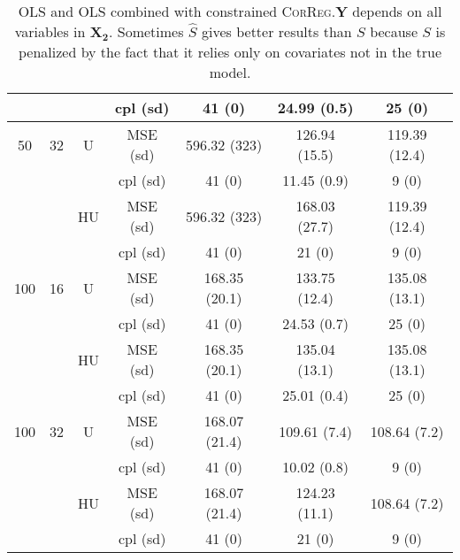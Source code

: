 \documentclass[11pt,a4paper]{article}
\begin{document}
\begin{table}[h!]
\begin{tabular}{|c|c|c|c|c|c|c|}
& & & cpl (sd) & 41 (0) & 24.99 (0.5) & 25 (0) \\
\hline %
50 & 32 & U&MSE (sd) & 596.32 (323) & 126.94 (15.5) & 119.39 (12.4) \\
& & & cpl (sd) & 41 (0) & 11.45 (0.9) & 9 (0) \\
 &  &HU &MSE (sd) & 596.32 (323) & 168.03 (27.7) & 119.39 (12.4) \\
& & &cpl (sd) & 41 (0) & 21 (0) & 9 (0) \\
\hline
\hline %
100 & 16 & U&  MSE (sd) & 168.35 (20.1) & 133.75 (12.4) & 135.08 (13.1) \\
& & & cpl (sd) & 41 (0) & 24.53 (0.7) & 25 (0) \\
 &  &HU &  MSE (sd) & 168.35 (20.1) & 135.04 (13.1) & 135.08 (13.1) \\
& & & cpl (sd) & 41 (0) & 25.01 (0.4) & 25 (0) \\
\hline %
100 & 32 & U&  MSE (sd) & 168.07 (21.4) & 109.61 (7.4) & 108.64 (7.2) \\
& & &  cpl (sd) & 41 (0) & 10.02 (0.8) & 9 (0) \\
 &  &HU & MSE (sd) & 168.07 (21.4) & 124.23 (11.1) & 108.64 (7.2) \\
& & & cpl (sd) & 41 (0) & 21 (0) & 9 (0) \\
\hline
\end{tabular} 
\caption{OLS and OLS combined with constrained \textsc{CorReg}.$\boldsymbol{Y}$  depends on all variables in $\boldsymbol{X_2}$. Sometimes $\hat{S}$ gives better results than $S$ because $S$ is penalized by the fact that it relies only on covariates not in the true model. } \label{YX2linOLS}
\end{table}
\end{document}
